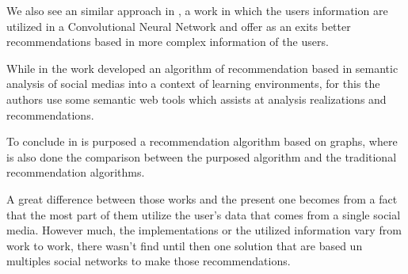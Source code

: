 We also see an similar approach in \cite{convolutional-network}, a work in which the users information are utilized in a Convolutional Neural Network and offer as an exits better recommendations based in more complex information of the users.

While in \cite{semantic-analysis-recommendation} the work developed an algorithm of recommendation based in semantic analysis of social medias into a context of learning environments, for this the authors use some semantic web tools which assists at analysis realizations and recommendations. 

To conclude in \cite{prediction-social-network} is purposed a recommendation algorithm based on graphs, where is also done the comparison between the purposed algorithm and the traditional recommendation algorithms. 

A great difference between those works and the present one becomes from a fact that the most part of them utilize the user’s data that comes from a single social media. However much, the implementations or the utilized information vary from work to work, there wasn’t find until then one solution that are based un multiples social networks to make those recommendations. 


